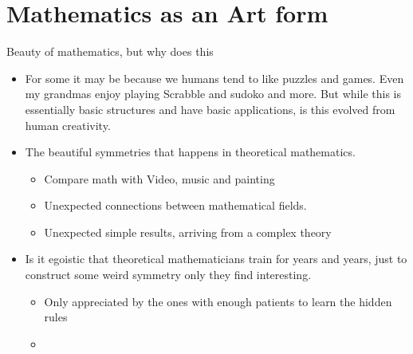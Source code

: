 \documentclass[10pt,conference]{IEEEtran}
\begin{document}
\begin{sloppy}
\begin{itemize}
\end{itemize}


\newpage
\section{Mathematics as an Art form}%
\label{sec:mathematics_for_stimulating_intellectual_mind}

Beauty of mathematics, but why does this
\begin{itemize}
    \item For some it may be because we humans tend to like puzzles and games. Even my grandmas enjoy playing Scrabble and sudoko and more. But while this is essentially basic structures and have basic applications, is this evolved from human creativity.
    \item The beautiful symmetries that happens in theoretical mathematics.
        \begin{itemize}
            \item Compare math with Video, music and painting
            \item Unexpected connections between mathematical fields.
            \item Unexpected simple results, arriving from a complex theory
        \end{itemize}
    \item Is it egoistic that theoretical mathematicians train for years and years, just to construct some weird symmetry only they find interesting.
        \begin{itemize}
            \item Only appreciated by the ones with enough patients to learn the hidden rules
            \item
        \end{itemize}
\end{itemize}

\newpage






    \printbibliography
\end{sloppy}
\end{document}
